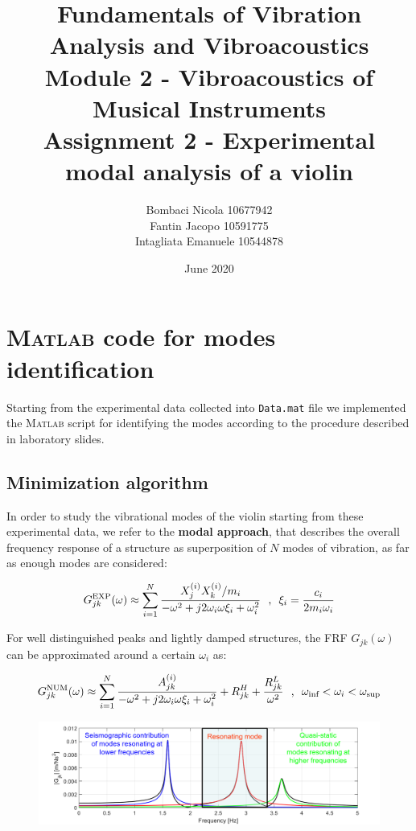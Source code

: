 \documentclass[a4paper,12pt,oneside]{article}
\title{Fundamentals of Vibration Analysis and Vibroacoustics \\
	Module 2 - Vibroacoustics of Musical Instruments \\
	Assignment 2 - Experimental modal analysis of a violin}
\author{Bombaci Nicola 10677942 \\
	Fantin Jacopo 10591775 \\
	Intagliata Emanuele 10544878}
\date{June 2020}
\begin{document}
\maketitle

\vspace{100pt}


\section{\textsc{Matlab} code for modes identification}
Starting from the experimental data collected into \lstinline!Data.mat! file we implemented the \textsc{Matlab} script for identifying the modes according to the
procedure described in laboratory slides.

\subsection{Minimization algorithm}
In order to study the vibrational modes of the violin starting from these experimental data, we refer to the \textbf{modal approach}, that describes the overall frequency response of a structure as superposition of $ N $ modes of vibration, as far as enough modes are considered:

\begin{equation}
\label{eqn:h_exp_modal} 
	G^\textup{EXP}_{jk}(\omega) \approx \sum_{i=1}^{N} \frac{X_j^{(i)} X_k^{(i)} / m_i}
		{-\omega^2 + j 2 \omega_i \omega \xi_i + \omega^2_i}
		\text{~ , ~}
		\xi_i = \frac{c_i}{2 m_i \omega_i}
\end{equation}

For well distinguished peaks and lightly damped structures, the FRF $ G_{jk} (\omega) $ can be approximated around a certain $ \omega_i $ as:

\begin{equation}
\label{eqn:h_approx} 
	G^\textup{NUM}_{jk}(\omega) \approx \sum_{i=1}^{N} \frac{ A_{jk}^{(i)} }
		{-\omega^2 + j 2 \omega_i \omega \xi_i + \omega^2_i}
		+ R^H_{jk} + \frac{R^L_{jk}}{\omega^2}
		\text{~ , ~}
		\omega_\textup{inf} < \omega_i < \omega_\textup{sup}
\end{equation}

\begin{figure}[H]
	\centering
	\includegraphics[scale=0.5]{Gapprox_slides}
\end{figure}
\end{document}
